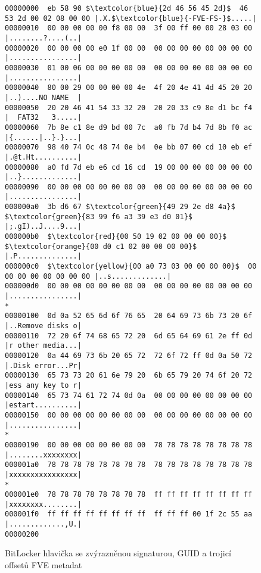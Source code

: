 \begin{figure}[h]
		\centering
		\captionsetup{width=0.65\linewidth}
		\caption{BitLocker hlavička se zvýrazněnou signaturou, GUID a trojicí offsetů FVE metadat}
		\label{fig:bitlocker-header}

\begin{lstlisting}[frame=none, escapechar=$, basicstyle=\ttfamily\small, columns=fullflexible, keepspaces=true]
00000000  eb 58 90 $\textcolor{blue}{2d 46 56 45 2d}$  46 53 2d 00 02 08 00 00 |.X.$\textcolor{blue}{-FVE-FS-}$.....|
00000010  00 00 00 00 00 f8 00 00  3f 00 ff 00 00 28 03 00 |........?....(..|
00000020  00 00 00 00 e0 1f 00 00  00 00 00 00 00 00 00 00 |................|
00000030  01 00 06 00 00 00 00 00  00 00 00 00 00 00 00 00 |................|
00000040  80 00 29 00 00 00 00 4e  4f 20 4e 41 4d 45 20 20 |..)....NO NAME  |
00000050  20 20 46 41 54 33 32 20  20 20 33 c9 8e d1 bc f4 |  FAT32   3.....|
00000060  7b 8e c1 8e d9 bd 00 7c  a0 fb 7d b4 7d 8b f0 ac |{......|..}.}...|
00000070  98 40 74 0c 48 74 0e b4  0e bb 07 00 cd 10 eb ef |.@t.Ht..........|
00000080  a0 fd 7d eb e6 cd 16 cd  19 00 00 00 00 00 00 00 |..}.............|
00000090  00 00 00 00 00 00 00 00  00 00 00 00 00 00 00 00 |................|
000000a0  3b d6 67 $\textcolor{green}{49 29 2e d8 4a}$  $\textcolor{green}{83 99 f6 a3 39 e3 d0 01}$ |;.gI)..J....9...|
000000b0  $\textcolor{red}{00 50 19 02 00 00 00 00}$  $\textcolor{orange}{00 d0 c1 02 00 00 00 00}$ |.P..............|
000000c0  $\textcolor{yellow}{00 a0 73 03 00 00 00 00}$  00 00 00 00 00 00 00 00 |..s.............|
000000d0  00 00 00 00 00 00 00 00  00 00 00 00 00 00 00 00 |................|
*
00000100  0d 0a 52 65 6d 6f 76 65  20 64 69 73 6b 73 20 6f |..Remove disks o|
00000110  72 20 6f 74 68 65 72 20  6d 65 64 69 61 2e ff 0d |r other media...|
00000120  0a 44 69 73 6b 20 65 72  72 6f 72 ff 0d 0a 50 72 |.Disk error...Pr|
00000130  65 73 73 20 61 6e 79 20  6b 65 79 20 74 6f 20 72 |ess any key to r|
00000140  65 73 74 61 72 74 0d 0a  00 00 00 00 00 00 00 00 |estart..........|
00000150  00 00 00 00 00 00 00 00  00 00 00 00 00 00 00 00 |................|
*
00000190  00 00 00 00 00 00 00 00  78 78 78 78 78 78 78 78 |........xxxxxxxx|
000001a0  78 78 78 78 78 78 78 78  78 78 78 78 78 78 78 78 |xxxxxxxxxxxxxxxx|
*
000001e0  78 78 78 78 78 78 78 78  ff ff ff ff ff ff ff ff |xxxxxxxx........|
000001f0  ff ff ff ff ff ff ff ff  ff ff ff 00 1f 2c 55 aa |.............,U.|
00000200
\end{lstlisting}

\end{figure}

